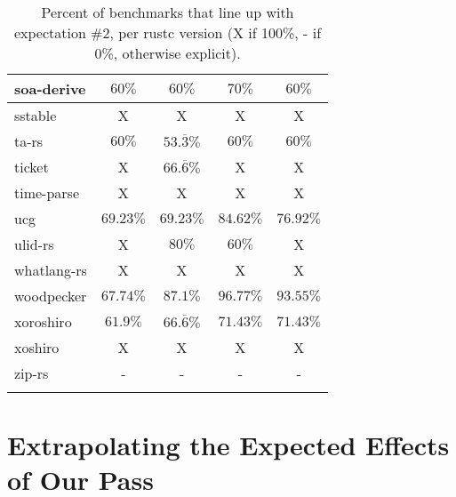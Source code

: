 \documentclass{article}
\begin{document}
\begin{longtable}[h!]{|l|c|c|c|c|}
     \hline
    soa-derive & $60\%$ & $60\%$ & $70\%$ & $60\%$ \\ %
    \hline
    sstable & X & X & X & X \\ %
     \hline
    ta-rs & $60\%$ & $53.\overline{3}\%$ & $60\%$ & $60\%$ \\ %
    \hline
    ticket & X & $66.\overline{6}\%$ & X & X \\ %
    \hline
    time-parse & X & X & X & X \\ %
    \hline
    ucg & $69.23\%$ & $69.23\%$ & $84.62\%$ & $76.92\%$ \\ %
    \hline
    ulid-rs & X & $80\%$ & $60\%$ & X \\ %
    \hline
    whatlang-rs & X & X & X & X \\ %
     \hline
    woodpecker & $67.74\%$ & $87.1\%$ & $96.77\%$ & $93.55\%$ \\ %
    \hline
    xoroshiro & $61.9\%$ & $66.\overline{6}\%$ & $71.43\%$ & $71.43\%$ \\ %
    \hline
    xoshiro & X & X & X & X \\ %
    \hline
    zip-rs & - & - & - & - \\ %
    \hline
  \caption{Percent of benchmarks that line up with expectation \#2, per rustc version (X if 100\%, - if 0\%, otherwise explicit).}
  \label{table:formatting2}
\end{longtable}



\section{Extrapolating the Expected Effects of Our Pass}
\end{document}
